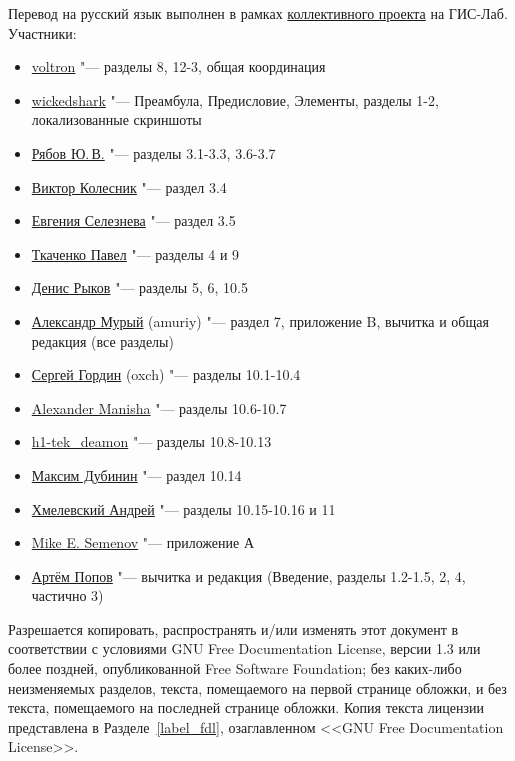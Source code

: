 Перевод на русский язык выполнен в рамках
\href{http://gis-lab.info/docs/qgis/manual15.html}{коллективного проекта}
на ГИС-Лаб. Участники:
\begin{itemize}[label=--]
\item \href{http://gis-lab.info/forum/memberlist.php?mode=viewprofile&u=5325}{voltron}
"--- разделы 8, 12-3, общая координация
\item \href{http://gis-lab.info/forum/memberlist.php?mode=viewprofile&u=7967}{wickedshark}
"--- Преамбула, Предисловие, Элементы, разделы 1-2, локализованные скриншоты
\item \href{http://gis-lab.info/forum/memberlist.php?mode=viewprofile&u=7619}{Рябов Ю.\,В.}
"--- разделы 3.1-3.3, 3.6-3.7
\item \href{http://gis-lab.info/forum/memberlist.php?mode=viewprofile&u=9954}{Виктор Колесник}
"--- раздел 3.4
\item \href{http://gis-lab.info/forum/memberlist.php?mode=viewprofile&u=7392}{Евгения Селезнева}
"--- раздел 3.5
\item \href{http://gis-lab.info/forum/memberlist.php?mode=viewprofile&u=8193}{Ткаченко Павел}
"--- разделы 4 и 9
\item \href{http://gis-lab.info/forum/memberlist.php?mode=viewprofile&u=6901}{Денис Рыков}
"--- разделы 5, 6, 10.5
\item \href{http://gis-lab.info/forum/memberlist.php?mode=viewprofile&u=8430}{Александр Мурый} (amuriy)
"--- раздел 7, приложение B, вычитка и общая редакция (все разделы)
\item \href{http://gis-lab.info/forum/memberlist.php?mode=viewprofile&u=9129}{Сергей Гордин} (oxch)
"--- разделы 10.1-10.4
\item \href{http://gis-lab.info/forum/memberlist.php?mode=viewprofile&u=1394}{Alexander Manisha}
"--- разделы 10.6-10.7
\item \href{http://gis-lab.info/forum/memberlist.php?mode=viewprofile&u=9850}{h1-tek\_deamon}
"--- разделы 10.8-10.13
\item \href{http://gis-lab.info/forum/memberlist.php?mode=viewprofile&u=2}{Максим Дубинин}
"--- раздел 10.14
\item \href{http://gis-lab.info/forum/memberlist.php?mode=viewprofile&u=9719}{Хмелевский Андрей}
"--- разделы 10.15-10.16 и 11
\item \href{http://gis-lab.info/forum/memberlist.php?mode=viewprofile&u=9876}{Mike E. Semenov}
"--- приложение А
\item \href{http://gis-lab.info/forum/memberlist.php?mode=viewprofile&u=7246}{Артём Попов}
"--- вычитка и редакция (Введение, разделы 1.2-1.5, 2, 4, частично 3)
\end{itemize}

\newpage


Разрешается копировать, распространять и/или изменять этот документ в
соответствии с условиями GNU Free Documentation License, версии 1.3 или
более поздней, опубликованной Free Software Foundation; без каких-либо
неизменяемых разделов, текста, помещаемого на первой странице обложки, и
без текста, помещаемого на последней странице обложки. Копия текста
лицензии представлена в Разделе~\ref{label_fdl}, озаглавленном <<GNU Free
Documentation License>>.

